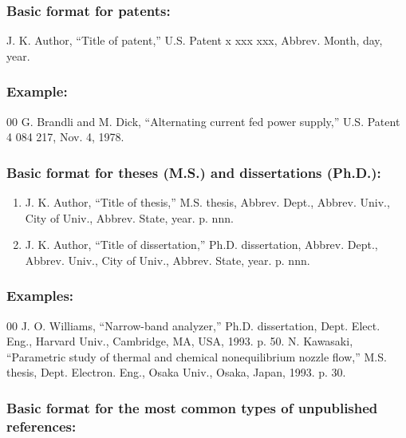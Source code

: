 \documentclass{IEEEoj}
\begin{document}
\subsubsection*{Basic format for patents:}

J. K. Author, ``Title of patent,'' U.S. Patent {x xxx xxx}, Abbrev. Month, day, year.

\subsubsection*{Example:}

\begin{thebibliography}{00}
 G. Brandli and M. Dick, ``Alternating current fed power supply,'' U.S. Patent 4 084 217, Nov. 4, 1978.
\end{thebibliography}

\subsubsection*{Basic format for theses (M.S.) and dissertations (Ph.D.):}

\renewcommand{\theenumi}{\alph{enumi}}
\begin{enumerate}
\item J. K. Author, ``Title of thesis,'' M.S. thesis, Abbrev. Dept., Abbrev.
Univ., City of Univ., Abbrev. State, year. p. nnn.
\item J. K. Author, ``Title of dissertation,'' Ph.D. dissertation, Abbrev.
Dept., Abbrev. Univ., City of Univ., Abbrev. State, year. p. nnn.
\end{enumerate}

\subsubsection*{Examples:}

\begin{thebibliography}{00}
 J. O. Williams, ``Narrow-band analyzer,'' Ph.D. dissertation, Dept. Elect. Eng., Harvard Univ., Cambridge, MA, USA, 1993. p. 50.
 N. Kawasaki, ``Parametric study of thermal and chemical nonequilibrium nozzle flow,'' M.S. thesis, Dept. Electron. Eng., Osaka Univ., Osaka, Japan, 1993. p. 30.
\end{thebibliography}

\subsubsection*{Basic format for the most common types of unpublished references:}
\end{document}
